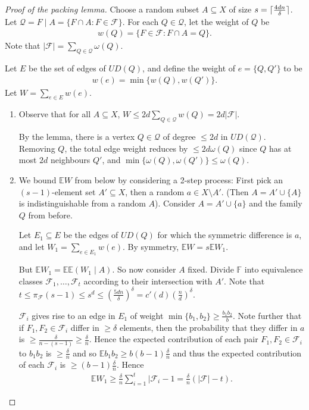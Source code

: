\documentclass{article}
\DeclarePairedDelimiter\ceil{\lceil}{\rceil}
\begin{document}
\begin{proof}[Proof of the packing lemma]
  Choose a random subset $A \subseteq X$ of size $s = \ceil{\frac{4dn}{\delta}}$.
  Let $\mathcal{Q} = F \mid A = \{F \cap A : F \in \mathcal{F}\}$.
  For each $Q \in \mathcal{Q}$, let the weight of $Q$ be
  \begin{align*}
    w(Q) = \{F \in \mathcal{F} : F \cap A = Q\}.
  \end{align*}
  Note that $|\mathcal{F}| = \sum_{Q \in \mathcal{Q}} \omega(Q)$.

  Let $E$ be the set of edges of $UD(Q)$, and define the weight of $e = \{Q,Q'\}$ to be
  \begin{align*}
    w(e) = \min\{w(Q),w(Q')\}.
  \end{align*}
  Let $W = \sum_{e \in E} w(e)$.
  \begin{enumerate}
    \item Observe that for all $A \subseteq X$, $W \leq 2 d \sum_{Q \in \mathcal{Q}} w(Q) = 2d |\mathcal{F}|$.

      By the lemma, there is a vertex $Q \in \mathcal{Q}$ of degree $\leq 2d$ in $UD(\mathcal{Q})$. Removing $Q$, the total edge weight reduces by $\leq 2 d \omega(Q)$ since $Q$ has at most $2d$ neighbours $Q'$, and $\min\{\omega(Q),\omega(Q')\} \leq \omega(Q)$.
    \item We bound $\mathbb{E}W$ from below by considering a 2-step process: First pick an $(s-1)$-element set $A' \subseteq X$, then a random $a \in X\setminus A'$. (Then $A = A' \cup \{A\}$ is indistinguishable from a random $A$).
      Consider $A = A' \cup \{a\}$ and the family $Q$ from before.

      Let $E_1 \subseteq E$ be the edges of $UD(Q)$ for which the symmetric difference is $a$, and let $W_1 = \sum_{e \in E_1} w(e)$.
      By symmetry, $\mathbb{E}W = s \mathbb{E}W_1$.

      But $\mathbb{E}W_1 = \mathbb{E} \mathbb{E}(W_1 \mid A)$. So now consider $A$ fixed.
      Divide $\mathbb{F}$ into equivalence classes $\mathcal{F}_1, \dotsc, \mathcal{F}_t$ according to their intersection with $A'$.
      Note that $t \leq \pi_\mathcal{F}(s-1) \leq s^d \leq (\frac{5dn}{\delta})^\delta = c'(d) (\frac{n}{d})^\delta$.

      $\mathcal{F}_i$ gives rise to an edge in $E_1$ of weight $\min\{b_1,b_2\} \geq \frac{b_1b_2}{b}$.
      Note further that if $F_1,F_2 \in \mathcal{F}_i$ differ in $\geq \delta$ elements, then the probability that they differ in $a$ is $\geq \frac{\delta}{n-(s-1)} \geq \frac{\delta}{n}$.
      Hence the expected contribution of each pair $F_1, F_2 \in \mathcal{F}_i$ to $b_1 b_2$ is $\geq \frac{\delta}{n}$ and so $\mathbb{E}b_1 b_2 \geq b(b-1) \frac{\delta}{n}$ and thus the expected contribution of each $\mathcal{F}_i$ is $\geq (b-1)\frac{\delta}{n}$.
      Hence
      \begin{align*}
        \mathbb{E}W_1 \geq \frac{\delta}{n} \sum_{i=1}^t |\mathcal{F}_i - 1 = \frac{\delta}{n} (|\mathcal{F}| - t).
      \end{align*}
  \end{enumerate}


\end{proof}
\end{document}
